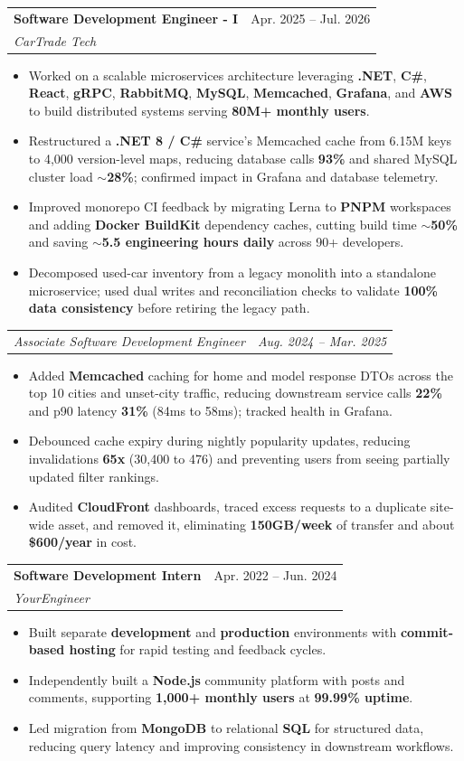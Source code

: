\documentclass[letterpaper,11pt]{article}
\makeatletter
\newcommand{\resumeItem}[1]{
  \item\small{
    {#1 \vspace{-2pt}}
  }
}
\newcommand{\resumeSubheading}[4]{
  \vspace{-2pt}\item
    \begin{tabular*}{0.97\textwidth}[t]{l@{\extracolsep{\fill}}r}
      \textbf{#1} & #2 \\
      \textit{\small#3} & \textit{\small #4} \\
    \end{tabular*}\vspace{-7pt}
}
\newcommand{\resumeSubSubheading}[2]{
    \item
    \begin{tabular*}{0.97\textwidth}{l@{\extracolsep{\fill}}r}
      \textit{\small#1} & \textit{\small #2} \\
    \end{tabular*}\vspace{-7pt}
}
\newcommand{\resumeItemListStart}{\begin{itemize}}
\newcommand{\resumeItemListEnd}{\end{itemize}\vspace{-5pt}}
\makeatother
\begin{document}
\resumeSubheading
{Software Development Engineer - I}{Apr. 2025 -- Jul. 2026}
{CarTrade Tech}{ }
\resumeItemListStart
\resumeItem{Worked on a scalable microservices architecture leveraging \textbf{.NET}, \textbf{C\#}, \textbf{React}, \textbf{gRPC}, \textbf{RabbitMQ}, \textbf{MySQL}, \textbf{Memcached}, \textbf{Grafana}, and \textbf{AWS} to build distributed systems serving \textbf{80M+ monthly users}.}
\resumeItem{Restructured a \textbf{.NET 8 / C\#} service's Memcached cache from 6.15M keys to 4,000 version-level maps, reducing database calls \textbf{93\%} and shared MySQL cluster load \textbf{$\sim$28\%}; confirmed impact in Grafana and database telemetry.}
\resumeItem{Improved monorepo CI feedback by migrating Lerna to \textbf{PNPM} workspaces and adding \textbf{Docker BuildKit} dependency caches, cutting build time \textbf{$\sim$50\%} and saving \textbf{$\sim$5.5 engineering hours daily} across 90+ developers.}
\resumeItem{Decomposed used-car inventory from a legacy monolith into a standalone microservice; used dual writes and reconciliation checks to validate \textbf{100\% data consistency} before retiring the legacy path.}
\resumeItemListEnd
\resumeSubSubheading
{Associate Software Development Engineer}{Aug. 2024 -- Mar. 2025}
\resumeItemListStart
\resumeItem{Added \textbf{Memcached} caching for home and model response DTOs across the top 10 cities and unset-city traffic, reducing downstream service calls \textbf{22\%} and p90 latency \textbf{31\%} (84ms to 58ms); tracked health in Grafana.}
\resumeItem{Debounced cache expiry during nightly popularity updates, reducing invalidations \textbf{65x} (30,400 to 476) and preventing users from seeing partially updated filter rankings.}
\resumeItem{Audited \textbf{CloudFront} dashboards, traced excess requests to a duplicate site-wide asset, and removed it, eliminating \textbf{150GB/week} of transfer and about \textbf{\$600/year} in cost.}
\resumeItemListEnd

\resumeSubheading
{Software Development Intern}{Apr. 2022 -- Jun. 2024}
{YourEngineer}{ }
\resumeItemListStart
\resumeItem{Built separate \textbf{development} and \textbf{production} environments with \textbf{commit-based hosting} for rapid testing and feedback cycles.}
\resumeItem{Independently built a \textbf{Node.js} community platform with posts and comments, supporting \textbf{1,000+ monthly users} at \textbf{99.99\% uptime}.}
\resumeItem{Led migration from \textbf{MongoDB} to relational \textbf{SQL} for structured data, reducing query latency and improving consistency in downstream workflows.}
\resumeItemListEnd
\end{document}

